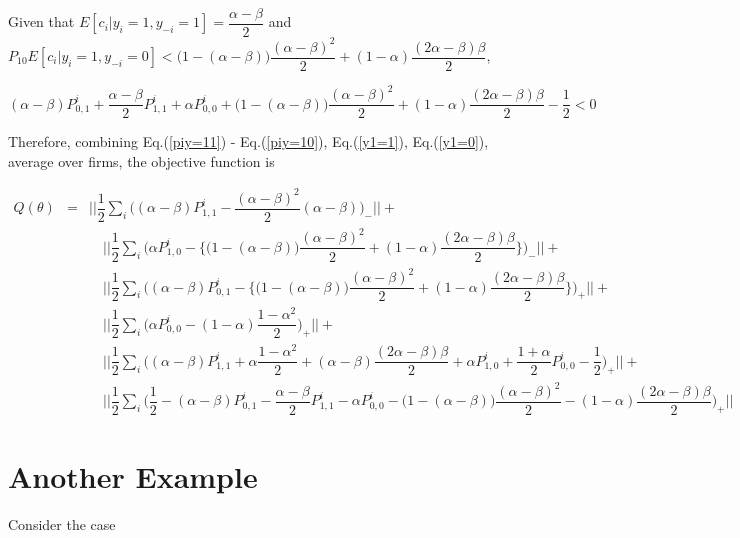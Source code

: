 \documentclass[draft]{article}
\begin{document}
Given that $E[c_i|y_i = 1, y_{-i} = 1] = \dfrac{\alpha - \beta}{2}$ and $P_{10}E[c_i|y_i = 1, y_{-i} = 0] < \big(1 - (\alpha - \beta)\big)\dfrac{(\alpha - \beta)^2}{2} + (1 - \alpha)\dfrac{(2\alpha - \beta)\beta}{2}$, 

\begin{equation}
    (\alpha - \beta)P^i_{0,1} + \dfrac{\alpha - \beta}{2}P^i_{1,1} + \alpha P^i_{0,0} + \big(1 - (\alpha - \beta)\big)\dfrac{(\alpha - \beta)^2}{2} + (1 - \alpha)\dfrac{(2\alpha - \beta)\beta}{2} - \dfrac{1}{2} < 0
\end{equation}

Therefore, combining Eq.(\ref{piy=11}) - Eq.(\ref{piy=10}), Eq.(\ref{y1=1}), Eq.(\ref{y1=0}),  average over firms, the objective function is 

$$
\begin{array}{rcl}
Q(\theta) & = & \displaystyle ||\dfrac{1}{2}\sum_i \big((\alpha - \beta)P^i_{1,1} - \dfrac{(\alpha - \beta)^2}{2}(\alpha - \beta) \big)_-|| + \\
&& \quad \displaystyle ||\dfrac{1}{2}\sum_i \big(\alpha P^i_{1,0} - \{\big(1 - (\alpha - \beta)\big)\dfrac{(\alpha - \beta)^2}{2} + (1 - \alpha)\dfrac{(2\alpha - \beta)\beta}{2}\} \big)_-|| + \\
&& \quad \displaystyle ||\dfrac{1}{2}\sum_i \big((\alpha - \beta)P^i_{0,1} - \{\big(1 - (\alpha - \beta)\big)\dfrac{(\alpha - \beta)^2}{2} + (1 - \alpha)\dfrac{(2\alpha - \beta)\beta}{2}\} \big)_+|| + \\
&& \quad \displaystyle ||\dfrac{1}{2}\sum_i \big(\alpha P^i_{0,0} - (1 - \alpha)\dfrac{1 - \alpha^2}{2} \big)_+|| +\\
&& \quad \displaystyle ||\dfrac{1}{2}\sum_i \big( (\alpha - \beta)P^i_{1, 1} + \alpha\dfrac{1 - \alpha^2}{2} + (\alpha- \beta)\dfrac{(2\alpha - \beta)\beta}{2} + \alpha P^i_{1, 0} + \dfrac{1 + \alpha}{2}P^i_{0, 0} - \dfrac{1}{2} \big)_+|| + \\
&& \quad \displaystyle ||\dfrac{1}{2}\sum_i \big(  \dfrac{1}{2} - (\alpha - \beta)P^i_{0,1} - \dfrac{\alpha - \beta}{2}P^i_{1,1} - \alpha P^i_{0,0} - \big(1 - (\alpha - \beta)\big)\dfrac{(\alpha - \beta)^2}{2} - (1 - \alpha)\dfrac{(2\alpha - \beta)\beta}{2}   \big)_+|| 
\end{array}
$$



\section{Another Example}
Consider the case 
\end{document}
